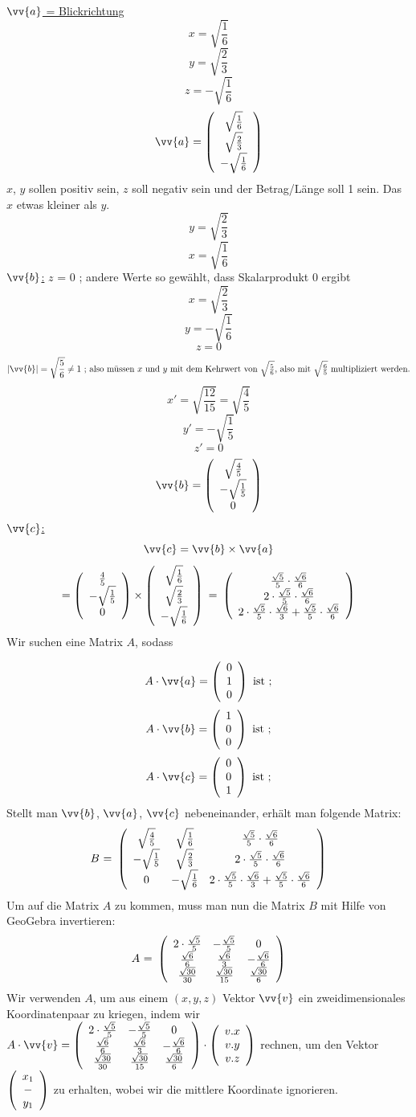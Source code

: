 \underline{$\vv{a}$ = Blickrichtung}
$$x = \sqrt{\frac{1}{6}}$$
$$y = \sqrt{\frac{2}{3}}$$
$$z = -\sqrt{\frac{1}{6}}$$
$$\vv{a}=\vektor{\sqrt{\frac{1}{6}}}{\sqrt{\frac{2}{3}}}{-\sqrt{\frac{1}{6}}} $$
$x$, $y$ sollen positiv sein, $z$ soll negativ sein und der Betrag/Länge soll 1 sein. Das $x$ etwas kleiner als $y$.
$$y= \sqrt{\frac{2}{3}}$$
$$x= \sqrt{\frac{1}{6}}$$
\underline{$\vv{b}$:}
$z$ = 0 ; andere Werte so gewählt, dass Skalarprodukt 0 ergibt
$$x= \sqrt{\frac{2}{3}}$$
$$y=-\sqrt{\frac{1}{6}}$$
$$z=0$$
$$|\vv{b}| = \sqrt{\frac{5}{6}}\neq 1\mbox{ ; also müssen $x$ und $y$ mit dem Kehrwert von $\sqrt{\frac{5}{6}}$, also mit $\sqrt{\frac{6}{5}}$ multipliziert werden.}$$
$$x' = \sqrt{\frac{12}{15}} = \sqrt{\frac{4}{5}}$$
$$y' = - \sqrt{\frac{1}{5}}$$
$$z' = 0$$
$$\vv{b}= \vektor{\sqrt{\frac{4}{5}}}{-\sqrt{\frac{1}{5}}}{0}$$
\underline{$\vv{c}$:}
$$\vv{c} = \vv{b}\times  \vv{a}$$
$$= \left(\begin{array}{c}\frac{4}{5}\\-\sqrt{\frac{1}{5}}\\0\end{array}\right)
      \times \left(\begin{array}{c}\sqrt{\frac{1}{6}}\\\sqrt{\frac{2}{3}}\\-\sqrt{\frac{1}{6}}\end{array}\right) \mbox{ = } 
     \left(\begin{array}{c} 
     \frac{\sqrt{5}}{5}\cdot\frac{\sqrt{6}}{6}\\2\cdot\frac{\sqrt{5}}{5}\cdot\frac{\sqrt{6}}{6}\\2\cdot\frac{\sqrt{5}}{5}\cdot\frac{\sqrt{6}}{3}+\frac{\sqrt{5}}{5}\cdot\frac{\sqrt{6}}{6}\end{array}\right)
$$
Wir suchen eine Matrix $A$, sodass

     $$A\cdot \vv{a}=\vektor{0}{1}{0}\mbox{ ist ;} $$
     $$A\cdot \vv{b}=\vektor{1}{0}{0}\mbox{ ist ;}$$
     $$A\cdot \vv{c}=\vektor{0}{0}{1}\mbox{ ist ;} $$
Stellt man $\vv{b}$, $\vv{a}$, $\vv{c}$ nebeneinander, erhält man folgende Matrix:
$$\mbox{$B$ = } \left(\begin{array}{ccc} \sqrt{\frac{4}{5}}&\sqrt{\frac{1}{6}}&\frac{\sqrt{5}}{5} \cdot \frac{\sqrt{6}}{6}\\ -\sqrt{\frac{1}{5}}&\sqrt{\frac{2}{3}}&2 \cdot \frac{\sqrt{5}}{5} \cdot \frac{\sqrt{6}}{6}\\ 0&-\sqrt{\frac{1}{6}}&2 \cdot \frac{\sqrt{5}}{5} \cdot \frac{\sqrt{6}}{3} + \frac{\sqrt{5}}{5} \cdot \frac{\sqrt{6}}{6}\\ \end{array}\right)$$
Um auf die Matrix $A$ zu kommen, muss man nun die Matrix $B$ mit Hilfe von GeoGebra invertieren:
$$\mbox{$A$ = } \left(\begin{array}{ccc} 2\cdot\frac{\sqrt{5}}{5}&-\frac{\sqrt{5}}{5}&0\\ \frac{\sqrt{6}}{6}&\frac{\sqrt{6}}{3}&-\frac{\sqrt{6}}{6}\\ \frac{\sqrt{30}}{30}&\frac{\sqrt{30}}{15}&\frac{\sqrt{30}}{6}\\ \end{array}\right)$$
Wir verwenden $A$, um aus einem $(x,y,z)$ Vektor $\vv{v}$ ein zweidimensionales Koordinatenpaar zu kriegen, indem wir $ A \cdot \vv{v} = \m {2\cdot\frac{\sqrt{5}}{5}}{-\frac{\sqrt{5}}{5}}{0}{\frac{\sqrt{6}}{6}}{\frac{\sqrt{6}}{3}}{-\frac{\sqrt{6}}{6}}{\frac{\sqrt{30}}{30}}{\frac{\sqrt{30}}{15}}{\frac{\sqrt{30}}{6}} \cdot \vektor{v.x}{v.y}{v.z}$ rechnen, um den Vektor $ \left(\begin{array}{c}x_1\\-\\y_1\end{array}\right)$ zu erhalten, wobei wir die mittlere Koordinate ignorieren.  
